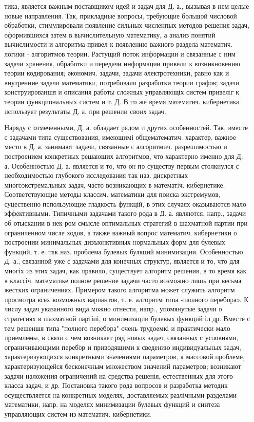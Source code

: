 \documentclass[10pt]{article}
\begin{document}
тика, является важным поставщиком идей и задач для Д. а., вызывая в нем целые новые направления. Так, прикладные вопросы, требующие большой числовой обработки, стимулировали появление сильных численпых методов решения задач, оформившихся затем в вычислительную математику, а анализ понятий вычислимости и алгоритма привел к появлению важного раздела математич. логики - алгоритмов теории. Растущий поток информации и связанные с ним задачи хранения, обработки и передачи информации привели к возникновению теории кодирования; әкономич. задачи, задачи әлектротехники, равно как и внутренние задачи математики, потребовали разработки теории графов; задачи конструированшя и описания работы сложных управляющіх систем привеліг к теории функциональных систем и т. Д. В то же время математич. кибернетика использует результаты Д. а. при решении своих задач.



Наряду с отмеченными, Д. а. обладает рядом и друrих особенностей. Так, вместе с задачами типа существования, имеющимі общематематич. характер, важное место в Д. а. занимают задачи, связанные с алгоритмич. разрешимостью и построением конкретных решающих алгоритмов, что характерно именно для Д. а. Особенностью Д. а. является и то, что он по существу первым столкнулся с необходимостью глубокого исследования так наз. дискретных многоэкстремальных задач, часто возникающих в математіч. кибернетике. Соответствующие методы классич. математики для поиска экстремумов, суцественно пспользующие гладкость функцій, в этих случаях оказываются мало эффективными. Типичными задачами такого рода в Д. а. являются, напр., задачи об отыскании в нек-ром смысле оптимальных стратегий в шахматной партии при ограниченном числе ходов, а также важный вопрос математич. кибернетики о построении минимальных дизъюнктивных нормальных форм для булевых функций, т. е. так наз. проблема булевых булкций минимизации. Особенностью Д. а., связанной уже с задачами для конечных структур, является и то, что для многіх из этих задач, как правило, существует алгоритм решения, в то время как в классіч. математике полное решение задачи часто возможно лишь при весьма жестких ограничениях. Примером такого алгоритма может служить алгоритм просмотра всех возможных вариантов, т. е. алгоритм типа «полного перебора». К числу задач указанного вида можно отнести, напр., упомянутые задачи о стратегиях в шахматной партіпі, о минимизации булевых функций іл др. Вместе с тем решеншя типа "полного перебора" очень трудоемкі и практически мало приемлемы, в связи с чем возникает ряд новых задач, связанных с условиями, ограничивающими переб̈ор и приводящими к сведению индивидуальных задач, характеризующихся конкретными значениями параметров, к массовой проблеме, характеризующейся бесконечным множеством значений параметров; возникают задачи наложения ограничений на средства решенія, естественных для этого класса задач, и др. Постановка такого рода вопросов и разработка методик осуществляется на конкретных моделях, доставляемых разлічными разделами математики, напр. на моделях минимизации булевых функций и синтеза управляющих систем из математич. кибернетики.
\end{document}

